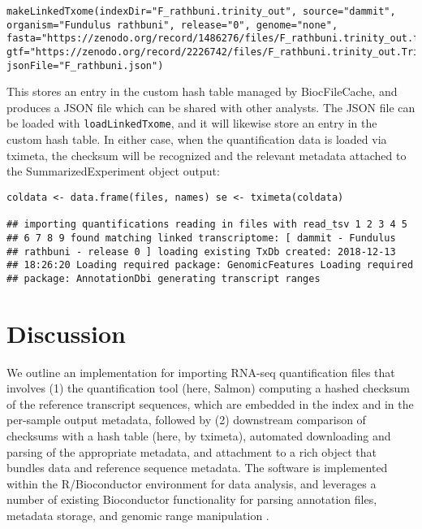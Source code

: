 \documentclass[12pt]{article} \usepackage[utf8]{inputenc}
\begin{document}
\begin{verbatim}
makeLinkedTxome(indexDir="F_rathbuni.trinity_out", source="dammit",
organism="Fundulus rathbuni", release="0", genome="none",
fasta="https://zenodo.org/record/1486276/files/F_rathbuni.trinity_out.fasta",
gtf="https://zenodo.org/record/2226742/files/F_rathbuni.trinity_out.Trinity.fasta.dammit.gff3",
jsonFile="F_rathbuni.json")
\end{verbatim}

This stores an entry in the custom hash table managed by
BiocFileCache, and produces a JSON file which can be shared with other
analysts. The JSON file can be loaded with \texttt{loadLinkedTxome},
and it will likewise store an entry in the custom hash table. In
either case, when the quantification data is loaded via tximeta, the
checksum will be recognized and the relevant metadata attached to the
SummarizedExperiment object output:

\begin{verbatim}
coldata <- data.frame(files, names) se <- tximeta(coldata)

## importing quantifications reading in files with read_tsv 1 2 3 4 5
## 6 7 8 9 found matching linked transcriptome: [ dammit - Fundulus
## rathbuni - release 0 ] loading existing TxDb created: 2018-12-13
## 18:26:20 Loading required package: GenomicFeatures Loading required
## package: AnnotationDbi generating transcript ranges
\end{verbatim}

\section*{Discussion}

We outline an implementation for importing RNA-seq quantification
files that involves (1) the quantification tool (here, Salmon)
computing a hashed checksum of the reference transcript sequences,
which are embedded in the index and in the per-sample output metadata,
followed by (2) downstream comparison of checksums with a hash table
(here, by tximeta), automated downloading and parsing of the
appropriate metadata, and attachment to a rich object that bundles
data and reference sequence metadata. The software is implemented
within the R/Bioconductor environment for data analysis, and leverages
a number of existing Bioconductor functionality for parsing annotation
files, metadata storage, and genomic range manipulation
\citep{bioc,ensembldb,biocfilecache,granges}.
\end{document}
